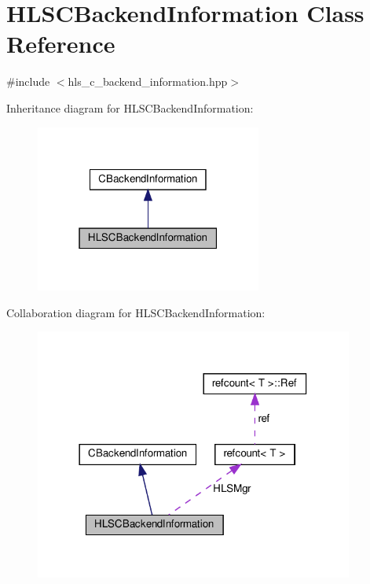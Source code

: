 \hypertarget{classHLSCBackendInformation}{}\section{H\+L\+S\+C\+Backend\+Information Class Reference}
\label{classHLSCBackendInformation}


{\ttfamily \#include $<$hls\+\_\+c\+\_\+backend\+\_\+information.\+hpp$>$}



Inheritance diagram for H\+L\+S\+C\+Backend\+Information\+:
\nopagebreak
\begin{figure}[H]
\begin{center}
\leavevmode
\includegraphics[width=211pt]{d1/dc7/classHLSCBackendInformation__inherit__graph}
\end{center}
\end{figure}


Collaboration diagram for H\+L\+S\+C\+Backend\+Information\+:
\nopagebreak
\begin{figure}[H]
\begin{center}
\leavevmode
\includegraphics[width=297pt]{d0/d37/classHLSCBackendInformation__coll__graph}
\end{center}
\end{figure}
